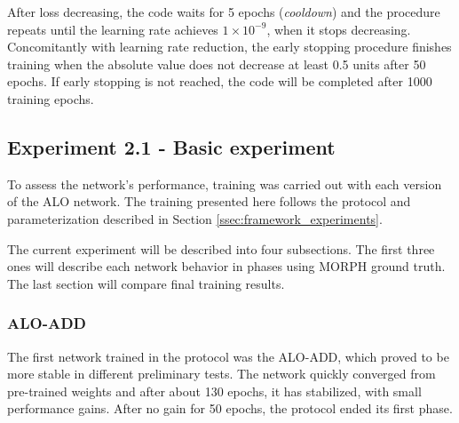 After loss decreasing, the code waits for 5 epochs (\textit{cooldown}) and the procedure repeats until the learning rate achieves $1 \times 10^{-9}$, when it stops decreasing.
Concomitantly with learning rate reduction, the early stopping procedure finishes training when the absolute value does not decrease at least 0.5 units after 50 epochs.
If early stopping is not reached, the code will be completed after 1000 training epochs.

\subsection{Experiment 2.1 - Basic experiment}
\label{ssec:bsds_subexp1}

To assess the network's performance, training was carried out with each version of the ALO network.
The training presented here follows the protocol and parameterization described in Section \ref{ssec:framework_experiments}.

The current experiment will be described into four subsections.
The first three ones will describe each network behavior in phases using MORPH ground truth.
The last section will compare final training results.

\subsubsection{ALO-ADD}
\label{ssec:bsds_subexp1_add}

The first network trained in the protocol was the ALO-ADD, which proved to be more stable in different preliminary tests.
The network quickly converged from pre-trained weights and after about 130 epochs, it has stabilized, with small performance gains.
After no gain for 50 epochs, the protocol ended its first phase.



